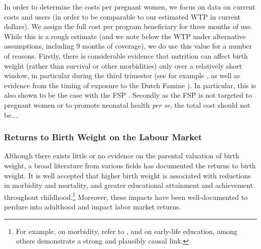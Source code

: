 \documentclass[a4paper, 11pt]{article}
\begin{document}
\begin{spacing}{1.4}
In order to determine the costs per pregnant women, we focus on data on
current costs and users (in order to be comparable to our estimated WTP
in current dollars).  We assign the full cost per program beneficiary for
three months of use.  While this is a rough estimate (and we note below
the WTP under alternative assumptions, including 9 months of coverage), we
do use this value for a number of reasons. Firstly, there is considerable
evidence that nutrition can affect birth weight (rather than survival or
other morbidities) only over a relatively short window, in particular
during the third trimester (see for example
\citet{StephensonSymonds2002}, as well as evidence from the timing of
exposure to the Dutch Famine \citep{Schulz2004}).  In particular, this
is also shown to be the case with the FSP \citep{Almondetal2011}.
Secondly as the FSP is not targeted to pregnant women or to promote
neonatal health \emph{per se}, the total cost should not be....



\subsubsection{Returns to Birth Weight on the Labour Market}
Although there exists little or no evidence on the parental valuation of
birth weight, a broad literature from various fields has documented
the returns to birth weight.  It is well accepted that higher birth
weight is associated with reductions in morbidity and mortality, and
greater educational attainment and achievement throughout
childhood.\footnote{For example, on morbidity, refer to
  \citet{Almondetal2005,Oreopoulosetal2008,Guptaetal2013,Conleyetal2003},
  and on early-life education, among others \citet{Figlioetal2014,
    LinLiu2009,Fletcher2011,Bharadwajetal2017,TorcheEchevarria2011}
  demonstrate a strong and plausibly causal link.}  Moreover, these
impacts have been well-documented to perdure into adulthood and impact
labor market returns.  %


\end{spacing}
\end{document}
